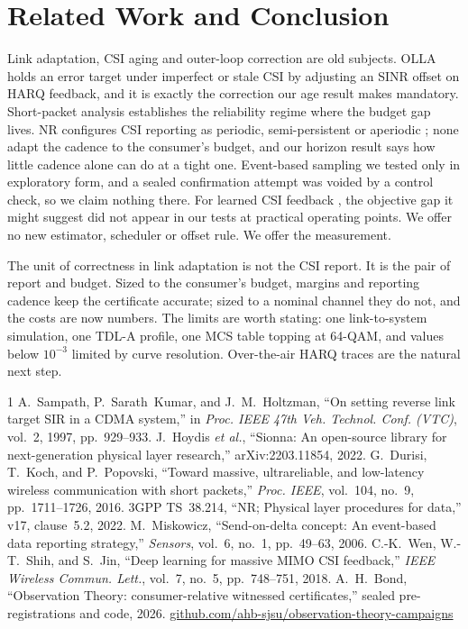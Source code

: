 \documentclass[conference]{IEEEtran}
\begin{document}
\section{Related Work and Conclusion}
Link adaptation, CSI aging and outer-loop correction are old subjects. OLLA
\cite{olla} holds an error target under imperfect or stale CSI by adjusting an
SINR offset on HARQ feedback, and it is exactly the correction our age result
makes mandatory. Short-packet analysis \cite{urllc} establishes the reliability
regime where the budget gap lives. NR configures CSI reporting as periodic,
semi-persistent or aperiodic \cite{cqireport}; none adapt the cadence to the
consumer's budget, and our horizon result says how little cadence alone can do
at a tight one. Event-based sampling \cite{sod} we tested only in exploratory
form, and a sealed confirmation attempt was voided by a control check, so we
claim nothing there. For learned CSI feedback \cite{csinet}, the objective gap
it might suggest did not appear in our tests at practical operating points. We
offer no new estimator, scheduler or offset rule. We offer the measurement.

The unit of correctness in link adaptation is not the CSI report. It is the pair
of report and budget. Sized to the consumer's budget, margins and reporting
cadence keep the certificate accurate; sized to a nominal channel they do not,
and the costs are now numbers. The limits are worth stating: one link-to-system
simulation, one TDL-A profile, one MCS table topping at 64-QAM, and values below
$10^{-3}$ limited by curve resolution. Over-the-air HARQ traces are the natural
next step.

\footnotesize
\begin{thebibliography}{1}
\setlength{\itemsep}{0pt plus 0pt}
\setlength{\parsep}{0pt}
 A.~Sampath, P.~Sarath~Kumar, and J.~M.~Holtzman, ``On setting reverse link
target SIR in a CDMA system,'' in \emph{Proc. IEEE 47th Veh. Technol. Conf. (VTC)},
vol.~2, 1997, pp.~929--933.
 J.~Hoydis \emph{et al.}, ``Sionna: An open-source library for
next-generation physical layer research,'' arXiv:2203.11854, 2022.
 G.~Durisi, T.~Koch, and P.~Popovski, ``Toward massive, ultrareliable, and
low-latency wireless communication with short packets,'' \emph{Proc. IEEE}, vol.~104,
no.~9, pp.~1711--1726, 2016.
 3GPP TS~38.214, ``NR; Physical layer procedures for data,''
v17, clause~5.2, 2022.
 M.~Miskowicz, ``Send-on-delta concept: An event-based data reporting
strategy,'' \emph{Sensors}, vol.~6, no.~1, pp.~49--63, 2006.
 C.-K.~Wen, W.-T.~Shih, and S.~Jin, ``Deep learning for massive MIMO CSI
feedback,'' \emph{IEEE Wireless Commun. Lett.}, vol.~7, no.~5, pp.~748--751, 2018.
 A.~H.~Bond, ``Observation Theory: consumer-relative
witnessed certificates,'' sealed pre-registrations and code, 2026.
\url{github.com/ahb-sjsu/observation-theory-campaigns}
\end{thebibliography}
\end{document}
